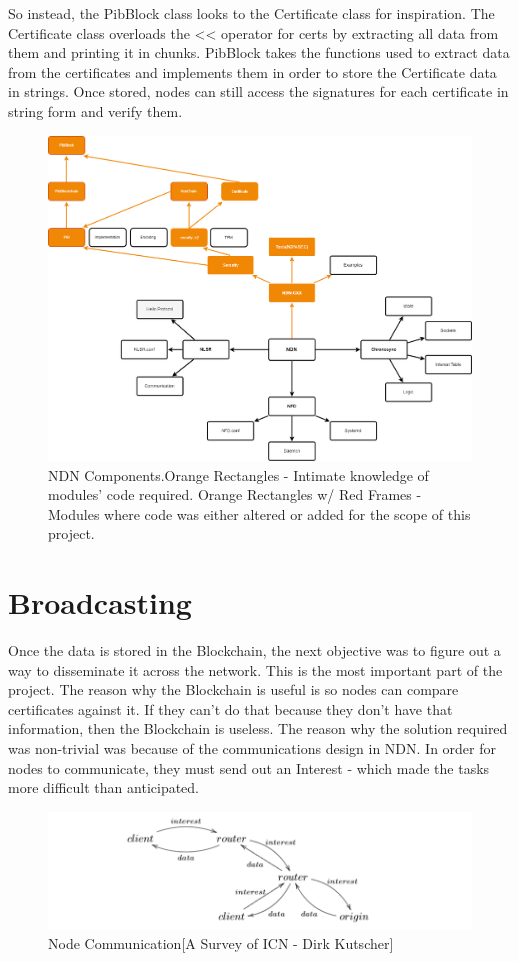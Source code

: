 So instead, the PibBlock class looks to the Certificate class for inspiration. The Certificate class overloads the << operator for certs by extracting all data from them and printing it in chunks. PibBlock takes the functions used to extract data from the certificates and implements them in order to store the Certificate data in strings. Once stored, nodes can still access the signatures for each certificate in string form and verify them.

\begin{figure}
\includegraphics[width=6in]{NDN.png}
\caption{
NDN Components.Orange Rectangles - Intimate knowledge of modules' code required. Orange Rectangles w/ Red Frames - Modules where code was either altered or added for the scope of this project.}
\end{figure}
\section{Broadcasting}
Once the data is stored in the Blockchain, the next objective was to figure out a way to disseminate it across the network. This is the most important part of the project. The reason why the Blockchain is useful is so nodes can compare certificates against it. If they can't do that because they don't have that information, then the Blockchain is useless. The reason why the solution required was non-trivial was because of the communications design in NDN. In order for nodes to communicate, they must send out an Interest - which made the tasks more difficult than anticipated. \par 
\begin{figure}[h]
\includegraphics[width=6in]{comms.png}
\caption{Node Communication[A Survey of ICN - Dirk Kutscher]}
\end{figure}
